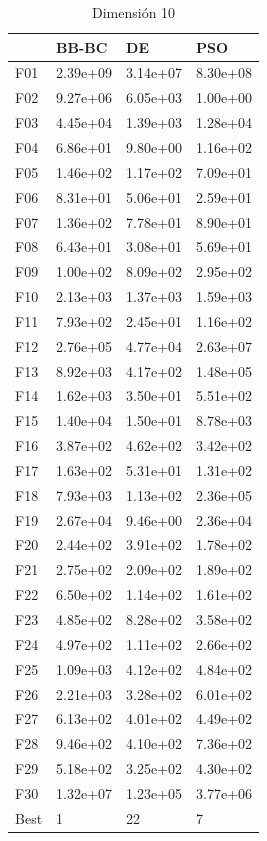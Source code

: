 \begin{table}[H]
    \begin{minipage}{.5\linewidth}
      \caption{Dimensión 10}
      \centering
      \begin{tabular}{llll}
        \toprule
        {} &     BB-BC &        DE &       PSO \\
        \midrule
        F01  &  2.39e+09 &  3.14e+07 &  8.30e+08 \\
        F02  &  9.27e+06 &  6.05e+03 &  1.00e+00 \\
        F03  &  4.45e+04 &  1.39e+03 &  1.28e+04 \\
        F04  &  6.86e+01 &  9.80e+00 &  1.16e+02 \\
        F05  &  1.46e+02 &  1.17e+02 &  7.09e+01 \\
        F06  &  8.31e+01 &  5.06e+01 &  2.59e+01 \\
        F07  &  1.36e+02 &  7.78e+01 &  8.90e+01 \\
        F08  &  6.43e+01 &  3.08e+01 &  5.69e+01 \\
        F09  &  1.00e+02 &  8.09e+02 &  2.95e+02 \\
        F10  &  2.13e+03 &  1.37e+03 &  1.59e+03 \\
        F11  &  7.93e+02 &  2.45e+01 &  1.16e+02 \\
        F12  &  2.76e+05 &  4.77e+04 &  2.63e+07 \\
        F13  &  8.92e+03 &  4.17e+02 &  1.48e+05 \\
        F14  &  1.62e+03 &  3.50e+01 &  5.51e+02 \\
        F15  &  1.40e+04 &  1.50e+01 &  8.78e+03 \\
        F16  &  3.87e+02 &  4.62e+02 &  3.42e+02 \\
        F17  &  1.63e+02 &  5.31e+01 &  1.31e+02 \\
        F18  &  7.93e+03 &  1.13e+02 &  2.36e+05 \\
        F19  &  2.67e+04 &  9.46e+00 &  2.36e+04 \\
        F20  &  2.44e+02 &  3.91e+02 &  1.78e+02 \\
        F21  &  2.75e+02 &  2.09e+02 &  1.89e+02 \\
        F22  &  6.50e+02 &  1.14e+02 &  1.61e+02 \\
        F23  &  4.85e+02 &  8.28e+02 &  3.58e+02 \\
        F24  &  4.97e+02 &  1.11e+02 &  2.66e+02 \\
        F25  &  1.09e+03 &  4.12e+02 &  4.84e+02 \\
        F26  &  2.21e+03 &  3.28e+02 &  6.01e+02 \\
        F27  &  6.13e+02 &  4.01e+02 &  4.49e+02 \\
        F28  &  9.46e+02 &  4.10e+02 &  7.36e+02 \\
        F29  &  5.18e+02 &  3.25e+02 &  4.30e+02 \\
        F30  &  1.32e+07 &  1.23e+05 &  3.77e+06 \\
        Best &         1 &        22 &         7 \\
        \bottomrule
        \end{tabular}
        

\end{minipage}
\end{table}
